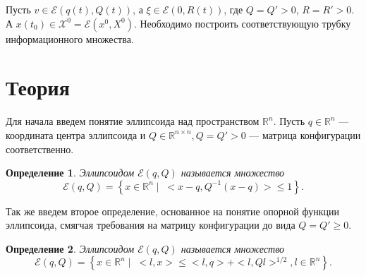 \documentclass[12pt]{article}
\newtheorem{define}{Определение}
\newcommand{\R}{\ensuremath{\mathbb{R}}} %
\newcommand{\E}{\ensuremath{\mathcal{E}}} %
\begin{document}
Пусть $v \in \E(q(t),Q(t))$, а $\xi \in \E(0, R(t))$, где $Q = Q' > 0$, $R = R' > 0$. А $x(t_0) \in \mathcal{X}^0 = \E(x^0, X^0)$. Необходимо построить соответствующую трубку информационного множества.

\section{Теория}
Для начала введем понятие эллипсоида над пространством $\R^n$. Пусть $q \in \R^n$ --- координата центра эллипсоида и $Q \in \R^{n \times n}, Q = Q' > 0$ --- матрица конфигурации соответственно.
\begin{define}
Эллипсоидом $\E(q,Q)$ называется множество
$$
\E(q,Q) = \left\{ x \in \R^n \mid \; <x-q,Q^{-1}(x-q)> \leqslant 1 \right\}.
$$
\end{define}

Так же введем второе определение, основанное на понятие опорной функции эллипсоида, смягчая требования на матрицу конфигурации до вида $Q = Q' \geqslant 0$.
\begin{define}
Эллипсоидом $\E(q,Q)$ называется множество
$$
\E(q,Q) = \left\{ x \in \R^n \mid \; <l,x> \leqslant <l,q> + <l,Ql>^{1/2}, l \in \R^n \right\}.
$$
\end{define}
\end{document}
